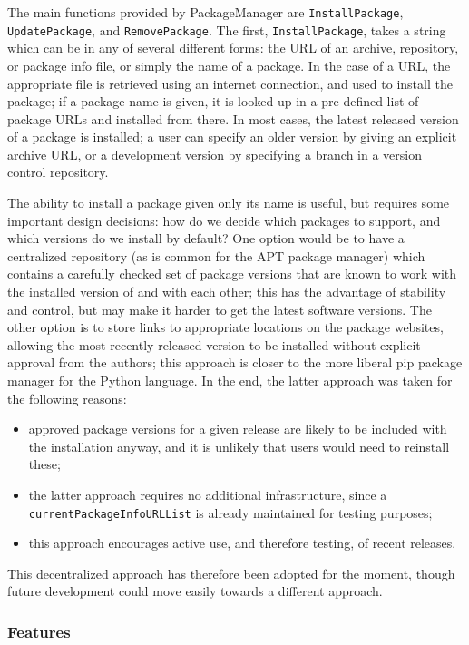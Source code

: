 The main functions provided by {\sf PackageManager} are \texttt{InstallPackage},
\texttt{UpdatePackage}, and \texttt{RemovePackage}.  The first,
\texttt{InstallPackage}, takes a string which can be in any of several different
forms: the URL of an archive, repository, or package info file, or simply the
name of a package.  In the case of a URL, the appropriate file is retrieved
using an internet connection, and used to install the package; if a package name
is given, it is looked up in a pre-defined list of package URLs and installed
from there.  In most cases, the latest released version of a package is
installed; a user can specify an older version by giving an explicit archive
URL, or a development version by specifying a branch in a
version control repository.  %

The ability to install a package given only its name is useful, but requires
some important design decisions: how do we decide which packages to support, and
which versions do we install by default?  One option would be to have a
centralized repository (as is common for the {\sf APT} package manager) which
contains a carefully checked set of package versions that are known to work with
the installed version of \GAP and with each other; this has the advantage of
stability and control, but may make it harder to get the latest software
versions.  The other option is to store links to appropriate locations on the
package websites, allowing the most recently released version to be installed
without explicit approval from the \GAP authors; this approach is closer to the
more liberal {\sf pip} package manager for the Python language.
In the end, the latter approach was taken for the following reasons:
\begin{itemize}
\item approved package versions for a given release are likely to be included
  with the \GAP installation anyway, and it is unlikely that users would need
  to reinstall these;
\item the latter approach requires no additional infrastructure, since a
  \texttt{currentPackageInfoURLList} is already maintained for testing purposes;
\item this approach encourages active use, and therefore testing, of recent releases.
\end{itemize}
This decentralized approach has therefore been adopted for the moment, though
future development could move easily towards a different approach.

\subsubsection{Features}

